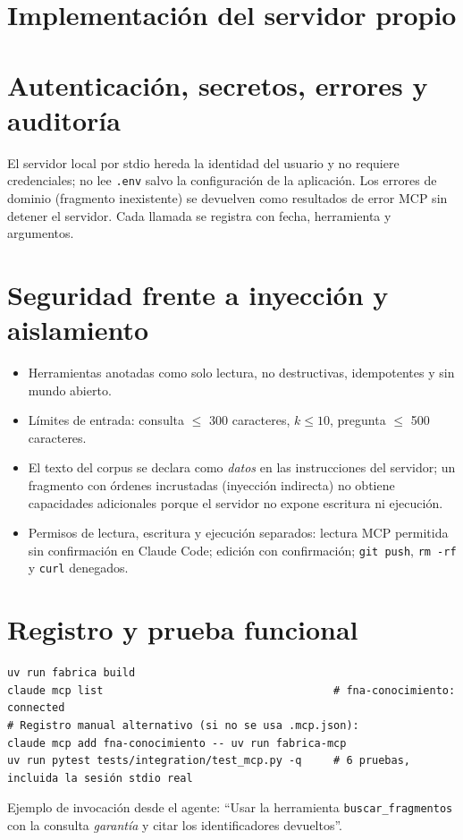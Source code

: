 \section{Implementación del servidor propio}


\section{Autenticación, secretos, errores y auditoría}
El servidor local por stdio hereda la identidad del usuario y no requiere credenciales; no lee
\texttt{.env} salvo la configuración de la aplicación. Los errores de dominio (fragmento inexistente) se devuelven
como resultados de error MCP sin detener el servidor. Cada llamada se registra con fecha, herramienta y
argumentos.

\section{Seguridad frente a inyección y aislamiento}\label{sec:permisos}
\begin{itemize}
  \item Herramientas anotadas como solo lectura, no destructivas, idempotentes y sin mundo abierto.
  \item Límites de entrada: consulta $\leq$ 300 caracteres, $k \leq 10$, pregunta $\leq$ 500 caracteres.
  \item El texto del corpus se declara como \emph{datos} en las instrucciones del servidor; un fragmento con
        órdenes incrustadas (inyección indirecta) no obtiene capacidades adicionales porque el servidor no
        expone escritura ni ejecución.
  \item Permisos de lectura, escritura y ejecución separados: lectura MCP permitida sin confirmación en Claude
        Code; edición con confirmación; \texttt{git push}, \texttt{rm -rf} y \texttt{curl} denegados.
\end{itemize}

\section{Registro y prueba funcional}
\begin{lstlisting}[style=ps]
uv run fabrica build
claude mcp list                                    # fna-conocimiento: connected
# Registro manual alternativo (si no se usa .mcp.json):
claude mcp add fna-conocimiento -- uv run fabrica-mcp
uv run pytest tests/integration/test_mcp.py -q     # 6 pruebas, incluida la sesión stdio real
\end{lstlisting}
Ejemplo de invocación desde el agente: ``Usar la herramienta \texttt{buscar\_fragmentos} con la consulta
\emph{garantía} y citar los identificadores devueltos''.

